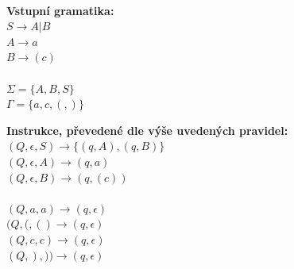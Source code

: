 \noindent\\\begin{minipage}[t]{0.35\textwidth}
\textbf{Vstupní gramatika:}\\
$S \rightarrow A | B$\\
$A \rightarrow a$\\
$B \rightarrow (c)$\\\smallskip\\
$\Sigma = \{A, B, S\}$\\
$\Gamma = \{a, c, (, )\}$
\end{minipage}
\begin{minipage}[t]{0.65\textwidth}
\textbf{Instrukce, převedené dle výše uvedených pravidel:}\\
$(Q, \epsilon, S) \rightarrow \{(q, A), (q, B)\}$\\
$(Q, \epsilon, A) \rightarrow (q, a)$\\
$(Q, \epsilon, B) \rightarrow (q, (c))$\\\smallskip\\
$(Q, a, a) \rightarrow (q, \epsilon)$\\
$(Q, (, () \rightarrow (q, \epsilon)$\\
$(Q, c, c) \rightarrow (q, \epsilon)$\\
$(Q, ), )) \rightarrow (q, \epsilon)$\\
\end{minipage}
